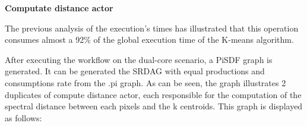    \begin{center}
   \textbf{Computate distance actor}
    \end{center}
   The previous analysis of the execution's times has illustrated that this operation consumes almost a 92$\%$ of the global execution time of the K-means algorithm. 
    
           After executing the workflow on the dual-core scenario, a PiSDF graph is generated. It can be generated the SRDAG with equal productions and consumptions rate from the .pi graph. As can be seen, the graph illustrates 2 duplicates of compute distance actor, each responsible for the computation of the spectral distance between each pixels and the k centroids. This graph is  displayed as follows:  
